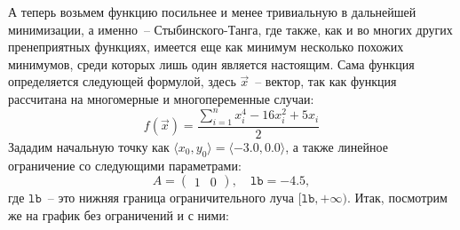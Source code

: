 \documentclass[12pt, a4paper, oneside, final]{article}
\begin{document}
	А теперь возьмем функцию посильнее и менее тривиальную в дальнейшей минимизации, а именно~-- Стыбинского-Танга, где также, как и во многих других пренеприятных функциях, имеется еще как минимум несколько похожих минимумов, среди которых лишь один является настоящим.
	Сама функция определяется следующей формулой, здесь $\vec{x}$~-- вектор, так как функция рассчитана на многомерные и многопеременные случаи:
	\[
		f(\vec{x}) = \dfrac{\sum\limits_{i = 1}^{n}{x_{i}^{4} - 16x_{i}^{2} + 5x_{i}}}{2}
	\]
	Зададим начальную точку как $\langle x_0, y_0 \rangle = \langle -3.0, 0.0 \rangle$, а также линейное ограничение со следующими параметрами:
	\[
		A =
		\begin{pmatrix}
			1 & 0
		\end{pmatrix}, \quad \mathtt{lb} = -4.5,
	\] где $\mathtt{lb}$~-- это нижняя граница ограничительного луча $[\mathtt{lb}, +\infty)$.
	Итак, посмотрим же на график без ограничений и с ними:
\end{document}
